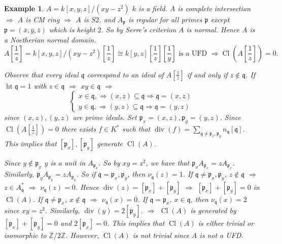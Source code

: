 \documentclass[cs4size]{article}
\newcommand{\su}{\subseteq}
\newcommand{\frp}{\mathfrak{p}}
\newcommand{\frq}{\mathfrak{q}}
\newcommand{\bb}{\mathbb}
\newcommand{\Ra}{\Rightarrow}
\DeclareMathOperator{\divi}{div}
\DeclareMathOperator{\Cl}{Cl}
\DeclareMathOperator{\height}{ht}
\newtheorem{ex}{Example}
\begin{document}
\begin{ex}
$A=k[x,y,z]/(xy-z^2)$ $k$ is a field. $A$ is complete intersection $\Ra$ $A$ is CM ring $\Ra$ $A$ is $S2$. and $A_\frp$ is regular for all primes $\frp$ except $\frp=(\bar{x},\bar{y},\bar{z})$ which is height $2$. So by Serre's criterion $A$ is normal. Hence $A$ is a Noetherian normal domain.
\[A[\frac{1}{z}]=k[x,y,z]/(xy-z^2)[\frac{1}{z}]\cong k[y,z][\frac{1}{z}][\frac{1}{y}]\text{ is a UFD }\Ra \Cl(A[\frac{1}{z}])=0.\]

Observe that every ideal $\frq$ correspond to an ideal of $A[\frac{1}{z}]$ if and only if $z\notin \frq$. If $\height\frq=1$ with $z\in \frq$ $\Ra$ $xy \in\frq$ $\Ra$
\[ \left\{
\begin{array}{ll}
x\in\frq, \Ra (x,z)\su \frq \Ra \frq=(x,z)\\
y\in\frq, \Ra (y,z)\su \frq \Ra \frq=(y,z)
\end{array}
\right.
\]
since $(x,z),(y,z)$ are prime ideals. Set $\frp_x=(x,z),\frp_y=(y,z)$. Since $\Cl(A[\frac{1}{z}])=0$ there exists $f\in K^*$ such that $\divi(f)=\sum\limits_{\frq\neq \frp_x,\frp_y}n_\frq [\frq]$. This implies that $[\frp_x],[\frp_y]$ generate $\Cl(A)$.

Since $y\notin \frp_x$ $y$ is a unit in $A_{\frp_x}$. So by $xy=z^2$, we have that $\frp_xA_{\frp_x}=zA_{\frp_x}$. Similarly, $\frp_yA_{\frp_y}=zA_{\frp_y}$. So if $\frq=\frp_x,\frp_y$, then $\nu_{\frq}(z)=1$. If $\frq\neq \frp_x,\frp_y$, $z\notin \frq$ $\Ra$ $z\in A_\frq^*$ $\Ra$ $\nu_\frq(z)=0$. Hence $\divi(z)=[\frp_x]+[\frp_y]$ $\Ra$ $[\frp_x]+[\frp_y]=0$ in $\Cl(A)$. If $\frq\neq \frp_x$, $x\notin\frq$ $\Ra$ $\nu_\frq(x)=0$. If $\frq=\frp_x$, $x\in\frq$, then $\nu_{\frq}(x)=2$ since $xy=z^2$. Similarly, $\divi(y)=2[\frp_y]$. $\Ra$ $\Cl(A)$ is generated by $[\frp_x]+[\frp_y]=0$ and $2[\frp_x]=0$. This implies that $\Cl(A)$ is either trivial or isomorphic to $\bb{Z}/2\bb{Z}$. However, $\Cl(A)$ is not trivial since $A$ is not a UFD.
\end{ex}
\end{document}

